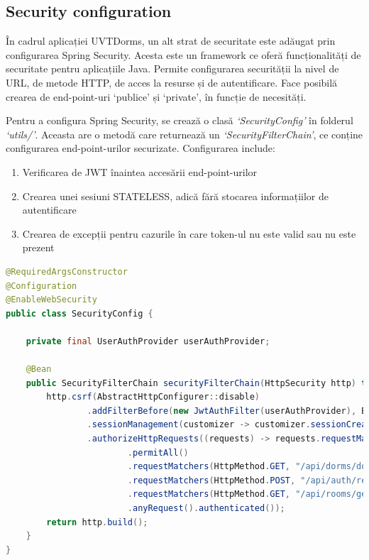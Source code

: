 \documentclass[12pt,a4paper]{report}
\theoremstyle{definition}
\theoremstyle{remark}
\begin{document}
\subsection{Security configuration}

\par În cadrul aplicației UVTDorms, un alt strat de securitate este adăugat prin configurarea Spring Security\cite{spilca2020spring}. Acesta este un framework ce oferă funcționalități de securitate pentru aplicațiile Java. Permite configurarea securității la nivel de URL, de metode HTTP, de acces la resurse și de autentificare. Face posibilă crearea de end-point-uri `publice' și `private', în funcție de necesități.

\par Pentru a configura Spring Security, se crează o clasă \textit{`SecurityConfig'} în folderul \textit{`utils/'}. Aceasta are o metodă care returnează un \textit{`SecurityFilterChain'}, ce conține configurarea end-point-urilor securizate. Configurarea include:

\begin{enumerate}
    \item Verificarea de JWT înaintea accesării end-point-urilor
    \item Crearea unei sesiuni STATELESS, adică fără stocarea informațiilor de autentificare
    \item Crearea de excepții pentru cazurile în care token-ul nu este valid sau nu este prezent
\end{enumerate}

\begin{lstlisting}[language=Java, caption={Clasa prin care se realizează configurarea Spring Security}]
@RequiredArgsConstructor
@Configuration
@EnableWebSecurity
public class SecurityConfig {

    private final UserAuthProvider userAuthProvider;

    @Bean
    public SecurityFilterChain securityFilterChain(HttpSecurity http) throws Exception {
        http.csrf(AbstractHttpConfigurer::disable)
                .addFilterBefore(new JwtAuthFilter(userAuthProvider), BasicAuthenticationFilter.class)
                .sessionManagement(customizer -> customizer.sessionCreationPolicy(SessionCreationPolicy.STATELESS))
                .authorizeHttpRequests((requests) -> requests.requestMatchers(HttpMethod.POST, "/api/auth/login")
                        .permitAll()
                        .requestMatchers(HttpMethod.GET, "/api/dorms/dorms-names").permitAll()
                        .requestMatchers(HttpMethod.POST, "/api/auth/register-student").permitAll()
                        .requestMatchers(HttpMethod.GET, "/api/rooms/get-rooms-numbers-from-dorm/**").permitAll()
                        .anyRequest().authenticated());
        return http.build();
    }
}
\end{lstlisting}
\end{document}
